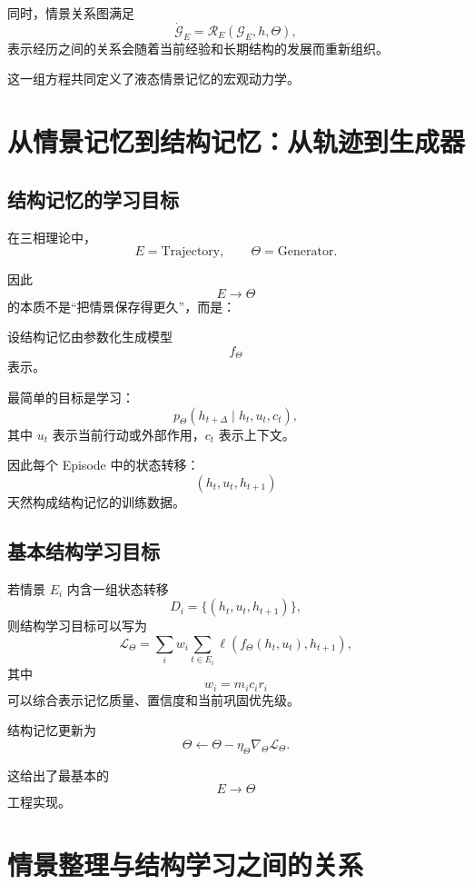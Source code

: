 同时，情景关系图满足
\[
\boxed{
\dot{\mathcal{G}}_E
=
\mathcal{R}_E
\left(
\mathcal{G}_E,
h,
\Theta
\right),
}
\]
表示经历之间的关系会随着当前经验和长期结构的发展而重新组织。

这一组方程共同定义了液态情景记忆的宏观动力学。

\section{从情景记忆到结构记忆：从轨迹到生成器}

\subsection{结构记忆的学习目标}

在三相理论中，
\[
E=\mathrm{Trajectory},
\qquad
\Theta=\mathrm{Generator}.
\]

因此
\[
E\rightarrow\Theta
\]
的本质不是“把情景保存得更久”，而是：
\begin{statementbox}
\centering
{}
\end{statementbox}

设结构记忆由参数化生成模型
\[
f_\Theta
\]
表示。

最简单的目标是学习：
\[
\boxed{
p_\Theta
\left(
h_{t+\Delta}
\mid
h_t,u_t,c_t
\right),
}
\]
其中 $u_t$ 表示当前行动或外部作用，$c_t$ 表示上下文。

因此每个 Episode 中的状态转移：
\[
(h_t,u_t,h_{t+1})
\]
天然构成结构记忆的训练数据。

\subsection{基本结构学习目标}

若情景 $E_i$ 内含一组状态转移
\[
D_i
=
\{
(h_t,u_t,h_{t+1})
\},
\]
则结构学习目标可以写为
\[
\boxed{
\mathcal{L}_\Theta
=
\sum_i
w_i
\sum_{t\in E_i}
\ell
\left(
f_\Theta(h_t,u_t),
h_{t+1}
\right),
}
\]
其中
\[
w_i
=
m_i
c_i
r_i
\]
可以综合表示记忆质量、置信度和当前巩固优先级。

结构记忆更新为
\[
\boxed{
\Theta
\leftarrow
\Theta
-
\eta_\Theta
\nabla_\Theta
\mathcal{L}_\Theta.
}
\]

这给出了最基本的
\[
E\rightarrow\Theta
\]
工程实现。

\section{情景整理与结构学习之间的关系}

